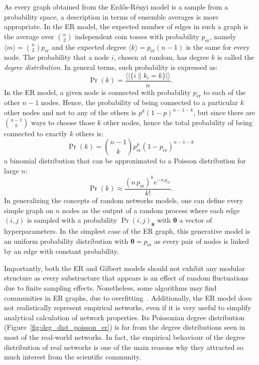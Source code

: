 As every graph obtained from the Erd\H{o}s-Rényi model is a sample from a probability space, a description in terms of ensemble averages is more appropriate.
In the ER model, the expected number of edges in such a graph is the average over $\binom{n}{2}$ independent coin tosses with probability $p_{\textrm{er}}$, namely $\langle  m  \rangle = \binom{n}{2}p_{\textrm{er}}$ and the expected degree $\langle  k \rangle = p_{\textrm{er}}(n-1)$ is the same for every node.
The probability that a node $i$, chosen at random, has degree $k$ is called the \emph{degree distribution}.
In general terms, such probability is expressed as:
\begin{equation}
\Pr(k) = \frac{\langle  |\{ i \| k_i=k \}| \rangle }{n}.
\end{equation}
In the ER model, a given node is connected with probability $p_{\textrm{er}}$ to each of the other $n-1$ nodes.
Hence, the probability of being connected to a particular $k$ other nodes and not to any of the others is $p^k(1-p)^{n-1-k}$, but since there are $\binom{n-1}{k}$ ways to choose those $k$ other nodes, hence the total probability of being connected to exactly $k$ others is:
\begin{equation}
\Pr(k) = \binom{n-1}{k}p_{\textrm{er}}^k(1-p_{\textrm{er}})^{n-1-k}
\end{equation}
a binomial distribution that can be approximated to a Poisson distribution for large $n$:
\begin{equation}
\Pr(k) \approx \frac{(n \, p_{\textrm{er}})^k e^{-n \, p_{\textrm{er}}} }{k!}.
\end{equation}
\bigbreak
In generalizing the concepts of random networks models, one can define every simple graph on $n$ nodes as the output of a random process where each edge $(i,j) $ is sampled with a probability $\Pr(i,j)_{ \boldsymbol \theta}$ with $\boldsymbol \theta$ a vector of hyperparameters.
In the simplest case of the ER graph, this generative model is an uniform probability distribution with $\boldsymbol \theta=p_{\textrm{er}}$ as every pair of nodes is linked by an edge with constant probability.

Importantly, both the ER and Gilbert models should not exhibit any modular structure as every substructure that appears is an effect of random fluctuations due to finite sampling effects. Nonetheless, some algorithms may find communities in ER graphs, due to overfitting~\cite{guimera2004}.
Additionally, the ER model does not realistically represent empirical networks, even if it is very useful to simplify analytical calculation of network properties.
Its Poissonian degree distribution (Figure~\ref{fig:deg_dist_poisson_er}) is far from the degree distributions seen in most of the real-world networks.
In fact, the empirical behaviour of the degree distribution of real networks is one of the main reasons why they attracted so much interest from the scientific community.

